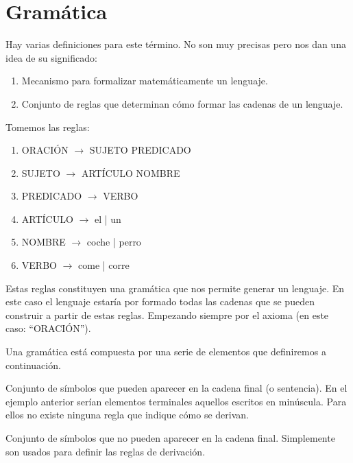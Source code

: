 \documentclass{apuntes}
\begin{document}
\chapter{Gramática}
\begin{defn}[Gramática]
Hay varias definiciones para este término. No son muy precisas pero nos dan una idea de su significado:
\begin{enumerate}
\item Mecanismo para formalizar matemáticamente un lenguaje.
\item Conjunto de reglas que determinan cómo formar las cadenas de un lenguaje.
\end{enumerate}
\end{defn}

\begin{example}
Tomemos las reglas:
\begin{enumerate}
\item ORACIÓN $\rightarrow$ SUJETO PREDICADO
\item SUJETO $\rightarrow$ ARTÍCULO NOMBRE
\item PREDICADO $\rightarrow$ VERBO
\item ARTÍCULO $\rightarrow$ el | un
\item NOMBRE $\rightarrow$ coche | perro
\item VERBO $\rightarrow$ come | corre
\end{enumerate}
Estas reglas constituyen una gramática que nos permite generar un lenguaje. En este caso el lenguaje estaría por formado todas las cadenas que se pueden construir a partir de estas reglas. Empezando siempre por el axioma (en este caso: ``ORACIÓN'').
\end{example}

Una gramática está compuesta por una serie de elementos que definiremos a continuación.

\begin{defn}
Conjunto de símbolos que pueden aparecer en la cadena final (o sentencia). En el ejemplo anterior serían elementos terminales aquellos escritos en minúscula. Para ellos no existe ninguna regla que indique cómo se derivan.
\end{defn}

\newpage
\begin{defn}
Conjunto de símbolos que no pueden aparecer en la cadena final. Simplemente son usados para definir las reglas de derivación.
\end{defn}
\end{document}
